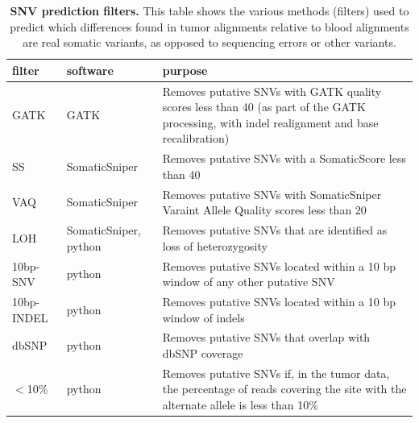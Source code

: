 \documentclass[11pt]{article} %
\begin{document}
\begin{landscape}
\begin{table}
\caption{\textbf{SNV prediction filters.} This table shows the various methods (filters) used to predict which differences found in tumor alignments relative to blood alignments are real somatic variants, as opposed to sequencing errors or other variants.}
\label{tab:filters}
\begin{tabular}{ p{2.25cm} p{4.25cm} p{14cm} }
	filter & software & purpose \\
	\hline
	GATK & GATK & Removes putative SNVs with GATK quality scores less than 40 (as part of the GATK processing, with indel realignment and base recalibration) \\
	SS & SomaticSniper & Removes putative SNVs with a SomaticScore less than 40 \\
	VAQ & SomaticSniper & Removes putative SNVs with SomaticSniper Varaint Allele Quality scores less than 20 \\
	LOH & SomaticSniper, python & Removes putative SNVs that are identified as loss of heterozygosity \\
	10bp-SNV & python & Removes putative SNVs located within a 10 bp window of any other putative SNV \\
	10bp-INDEL & python & Removes putative SNVs located within a 10 bp window of indels \\
	dbSNP & python & Removes putative SNVs that overlap with dbSNP coverage \\
	$<$10\% & python & Removes putative SNVs if, in the tumor data, the percentage of reads covering the site with the alternate allele is less than 10\% \\
\end{tabular}
\end{table}
\end{landscape}
\end{document}
